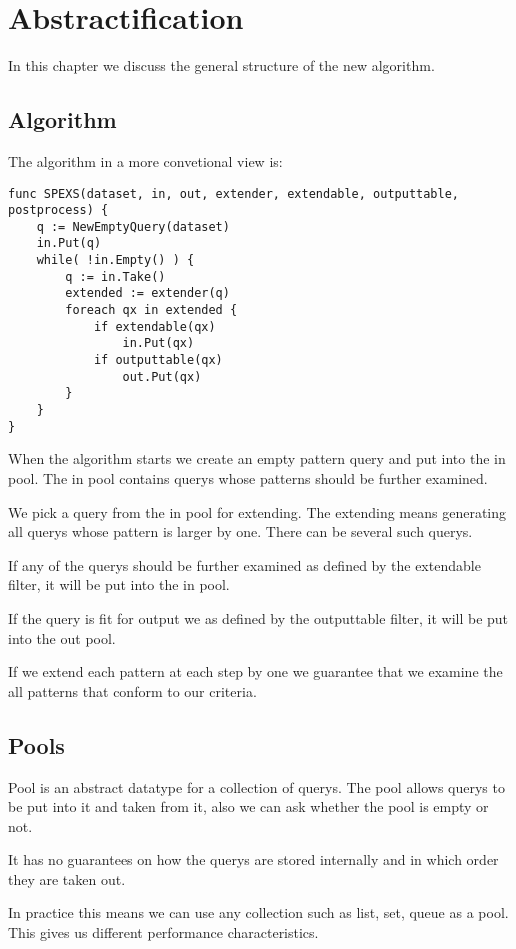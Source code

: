 \chapter{Abstractification}

In this chapter we discuss the general structure of the new algorithm.

\section{Algorithm}

The algorithm in a more convetional view is:

\begin{verbatim}
func SPEXS(dataset, in, out, extender, extendable, outputtable, postprocess) {
	q := NewEmptyQuery(dataset)
	in.Put(q)
	while( !in.Empty() ) {
		q := in.Take()
		extended := extender(q)
		foreach qx in extended {
			if extendable(qx)
				in.Put(qx)
			if outputtable(qx)
				out.Put(qx)
		}
	}
}
\end{verbatim}

When the algorithm starts we create an empty pattern query and put 
into the in pool. The in pool contains querys whose patterns
should be further examined.

We pick a query from the in pool for extending. The extending means
generating all querys whose pattern is larger by one. There can be
several such querys.

If any of the querys should be further examined as defined by the
extendable filter, it will be put into the in pool.

If the query is fit for output we as defined by the outputtable filter,
it will be put into the out pool.

If we extend each pattern at each step by one we guarantee that we
examine the all patterns that conform to our criteria.

\section{Pools}

Pool is an abstract datatype for a collection of querys. The pool
allows querys to be put into it and taken from it, also we can
ask whether the pool is empty or not.

It has no guarantees on how the querys are stored internally and
in which order they are taken out.

In practice this means we can use any collection such as list, set,
queue as a pool. This gives us different performance characteristics.

